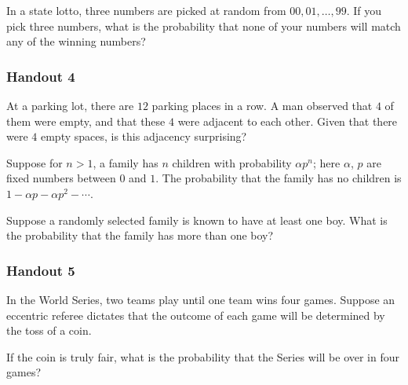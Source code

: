 \begin{problem}[Handout 3, \# 6]
  In a state lotto, three numbers are picked at random from
  \(00,01,\dotsc,99\). If you pick three numbers, what is the probability
  that none of your numbers will match any of the winning numbers?
\end{problem}
\begin{solution*}
\end{solution*}

\subsubsection{Handout 4}
\begin{problem}[Handout 4, \# 4]
  At a parking lot, there are \(12\) parking places in a row. A man
  observed that \(4\) of them were empty, and that these \(4\) were
  adjacent to each other. Given that there were \(4\) empty spaces, is this
  adjacency surprising?
\end{problem}
\begin{solution*}
\end{solution*}

\begin{problem}[Handout 4, \# 16]
  Suppose for \(n>1\), a family has \(n\) children with probability
  \(\alpha p^n\); here \(\alpha\), \(p\) are fixed numbers between \(0\)
  and \(1\). The probability that the family has no children is \(1-\alpha
  p-\alpha p^2-\dotsb\).

  \noindent Suppose a randomly selected family is known to have at least
  one boy. What is the probability that the family has more than one boy?
\end{problem}
\begin{solution*}
\end{solution*}

\subsubsection{Handout 5}
\begin{problem}[Handout 5, \# 6]
  In the World Series, two teams play until one team wins four
  games. Suppose an eccentric referee dictates that the outcome of each
  game will be determined by the toss of a coin.

  \noindent If the coin is truly fair, what is the probability that the
  Series will be over in four games?
\end{problem}
\begin{solution*}
\end{solution*}

